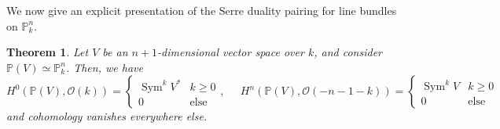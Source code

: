 \documentclass[10pt]{article}
\newtheorem{thm}{Theorem}[section]
\theoremstyle{definition}
\DeclareMathOperator{\Hom}{Hom}
\DeclareMathOperator{\Sym}{Sym}
\newcommand{\PP}{\mathbb{P}}
\newcommand{\OO}{\mathcal{O}}
\begin{document}
We now give an explicit presentation of the Serre duality pairing for line bundles on $\PP^n_k$.
\begin{thm}
Let $V$ be an $n+1$-dimensional vector space over $k$, and consider $\mathbb{P}(V) \simeq \mathbb{P}^{n}_k$.  Then, we have
$$H^0(\PP(V), \OO(k)) = \begin{cases} \Sym^k V^* & k \geq 0 \\ 0 & \mathrm{else} \end{cases}, \;\;\;\;\; H^n(\PP(V), \OO(-n - 1 - k)) = \begin{cases} \Sym^k V & k \geq 0 \\ 0 & \mathrm{else} \end{cases}$$
and cohomology vanishes everywhere else.  %
\end{thm}
\end{document}
